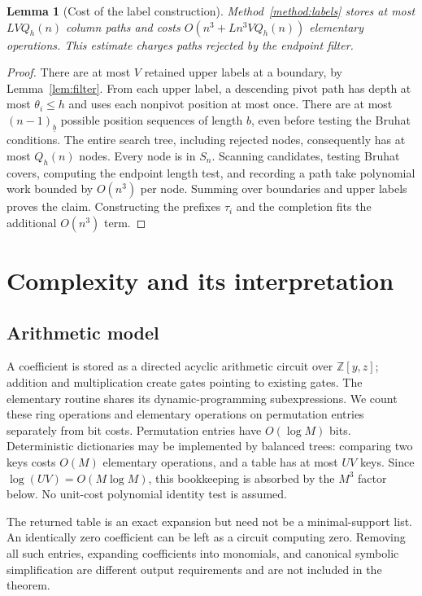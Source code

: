 \documentclass{amsart}
\newtheorem{lemma}[theorem]{Lemma}
\theoremstyle{definition}
\theoremstyle{remark}
\numberwithin{equation}{section}
\newcommand{\fall}[2]{(#1)_{\underline{#2}}}
\begin{document}
\begin{lemma}[Cost of the label construction]\label{lem:labelwork}
Method~\ref{method:labels} stores at most $L V Q_h(n)$ column paths
and costs $O(n^3+L n^3 V Q_h(n))$ elementary operations.
This estimate charges paths rejected by the endpoint filter.
\end{lemma}
\begin{proof}
There are at most $V$ retained upper labels at a boundary, by
Lemma~\ref{lem:filter}.
From each upper label, a descending pivot path has depth at most
$\theta_i\leq h$ and uses each nonpivot position at most once.
There are at most $\fall{n-1}{b}$ possible position sequences of
length $b$, even before testing the Bruhat conditions.
The entire search tree, including rejected nodes, consequently has
at most $Q_h(n)$ nodes.
Every node is in $S_n$.
Scanning candidates, testing Bruhat covers, computing the endpoint
length test, and recording a path take polynomial work bounded by
$O(n^3)$ per node.
Summing over boundaries and upper labels proves the claim.
Constructing the prefixes $\tau_i$ and the completion fits the
additional $O(n^3)$ term.
\end{proof}

\section{Complexity and its interpretation}\label{sec:complexity}

\subsection{Arithmetic model}

A coefficient is stored as a directed acyclic arithmetic circuit over
$\mathbb Z[y,z]$; addition and multiplication create gates pointing to
existing gates.
The elementary routine shares its dynamic-programming subexpressions.
We count these ring operations and elementary operations on permutation
entries separately from bit costs.
Permutation entries have $O(\log M)$ bits.
Deterministic dictionaries may be implemented by balanced trees:
comparing two keys costs $O(M)$ elementary operations, and a table
has at most $UV$ keys.
Since $\log(UV)=O(M\log M)$, this bookkeeping is absorbed by the
$M^3$ factor below.
No unit-cost polynomial identity test is assumed.

The returned table is an exact expansion but need not be a
minimal-support list.
An identically zero coefficient can be left as a circuit computing zero.
Removing all such entries, expanding coefficients into monomials, and
canonical symbolic simplification are different output requirements
and are not included in the theorem.
\end{document}

